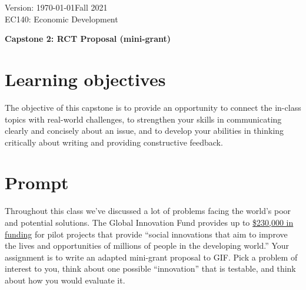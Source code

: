 \documentclass[11pt]{article}
\begin{document}
\thispagestyle{plain}
\singlespacing


Version: \today \hfill Fall 2021\\
EC140: Economic Development
\begin{center}
\Large{\textbf{Capstone 2: RCT Proposal (mini-grant)}}\\
\end{center}
\bigskip


\hypertarget{learning-objectives-1}{%
\section*{Learning objectives}\label{learning-objectives-1}}

The objective of this capstone is to provide an opportunity to connect
the in-class topics with real-world challenges, to strengthen your
skills in communicating clearly and concisely about an issue, and to
develop your abilities in thinking critically about writing and
providing constructive feedback.

\hypertarget{prompt-1}{%
\section*{Prompt}\label{prompt-1}}

Throughout this class we've discussed a lot of problems facing the
world's poor and potential solutions. The Global Innovation Fund
provides up to
\href{https://www.globalinnovation.fund/apply/about/what-we-fund/}{\$230,000
in funding} for pilot projects that provide ``social innovations that
aim to improve the lives and opportunities of millions of people in the
developing world.'' Your assignment is to write an adapted mini-grant
proposal to GIF. Pick a problem of interest to you, think about one
possible ``innovation'' that is testable, and think about how you would
evaluate it.
\end{document}
